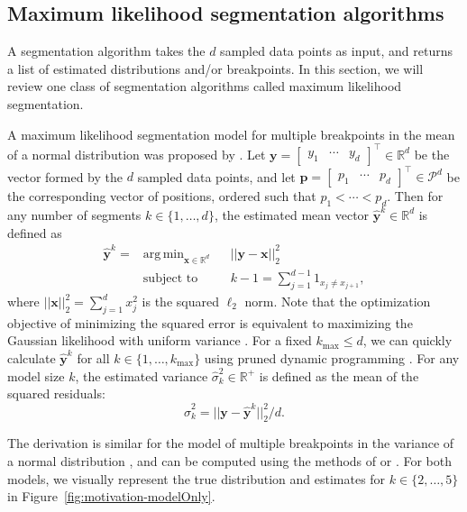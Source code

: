 \documentclass{article}
\DeclareMathOperator*{\argmin}{arg\,min}
\newcommand{\RR}{\mathbb{R}}
\begin{document}
\subsection{Maximum likelihood segmentation algorithms}
\label{sec:max-lik}

A segmentation algorithm takes the $d$ sampled data points as input,
and returns a list of estimated distributions and/or breakpoints. In
this section, we will review one class of segmentation algorithms
called maximum likelihood segmentation.

A maximum likelihood segmentation model for multiple breakpoints in
the mean of a normal distribution was proposed by
\citet{statistical-approach}. Let $\mathbf y = \left[
  \begin{array}{ccc}
    y_1 & \cdots & y_d
  \end{array}
\right]^\intercal \in \RR^d$ be the vector formed by the $d$
sampled data points, and let  $\mathbf p = \left[
  \begin{array}{ccc}
    p_1 & \cdots & p_d
  \end{array}
\right]^\intercal \in \mathcal P^d$ be the corresponding vector of
positions, ordered such that $p_1 < \cdots < p_d$. Then for any number
of segments $k\in\{1, \dots, d\}$, the estimated mean vector $\mathbf{\hat
  y}^k\in\RR^d$ is defined as
\begin{equation}
\label{eq:yhat^k}
\begin{aligned}
\mathbf{\hat  y}^k = &\argmin_{\mathbf x \in \RR^d} &&  ||\mathbf y - \mathbf x||^2_2
\\
&\text{subject to} && k-1=\sum_{j=1}^{d-1} 1_{x_j\neq x_{j+1}},
\end{aligned}
\end{equation}
where $||\mathbf x||^2_2=\sum_{j=1}^d x_j^2$ is the squared $\ell_2$
norm. Note that the optimization objective of minimizing the squared
error is equivalent to maximizing the Gaussian likelihood with uniform
variance \citep{statistical-approach}. For a fixed $k_{\text{max}}\leq
d$, we can quickly calculate $\mathbf{\hat y}^k$ for all
$k\in\{1,\dots,k_{\text{max}}\}$ using pruned dynamic programming
\citep{pruned-dp}. For any model size $k$, the estimated variance
$\hat \sigma^2_k\in\RR^+$ is defined as the mean of the squared
residuals:
\begin{equation}
  \label{eq:sigmahat}
  \hat \sigma_k^2 = ||\mathbf y - \mathbf{\hat y}^k||^2_2/d.
\end{equation}

The derivation is similar for the model of multiple breakpoints in the
variance of a normal distribution \citep{lavielle2005}, and can be
computed using the methods of \citet{pelt} or \citet{segmentor}. For
both models, we visually represent the true distribution and estimates
for $k\in\{2, \dots, 5\}$ in Figure~\ref{fig:motivation-modelOnly}.
\end{document}

